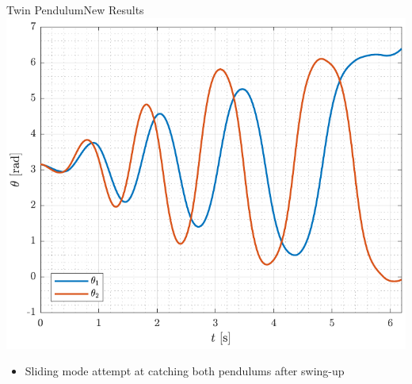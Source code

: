 \begin{frame}{Twin Pendulum}{New Results}
  \centering
  \includegraphics[width=.6\textwidth]{figures/thetaSlidingModeCatchAttempt}
  \begin{itemize}\vspace{6pt}
    \item Sliding mode attempt at catching both pendulums after swing-up
  \end{itemize}
\end{frame}

